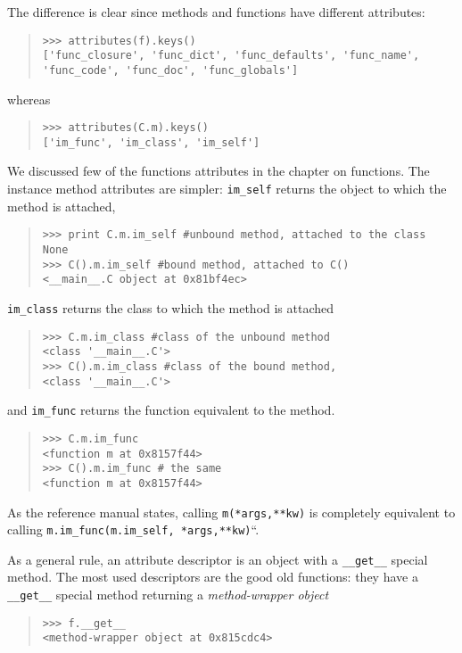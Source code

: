 \documentclass[10pt,english]{article}
\begin{document}
The difference is clear since methods and functions have different attributes:
\begin{quote}
\begin{verbatim}>>> attributes(f).keys()
['func_closure', 'func_dict', 'func_defaults', 'func_name', 
'func_code', 'func_doc', 'func_globals']\end{verbatim}
\end{quote}

whereas
\begin{quote}
\begin{verbatim}>>> attributes(C.m).keys()
['im_func', 'im_class', 'im_self']\end{verbatim}
\end{quote}

We discussed few of the functions attributes in the chapter
on functions. The instance method attributes are simpler: \texttt{im{\_}self} 
returns the object to which the method is attached,
\begin{quote}
\begin{verbatim}>>> print C.m.im_self #unbound method, attached to the class
None
>>> C().m.im_self #bound method, attached to C()
<__main__.C object at 0x81bf4ec> \end{verbatim}
\end{quote}

\texttt{im{\_}class} returns the class to which the
method is attached
\begin{quote}
\begin{verbatim}>>> C.m.im_class #class of the unbound method
<class '__main__.C'>
>>> C().m.im_class #class of the bound method,
<class '__main__.C'>\end{verbatim}
\end{quote}

and \texttt{im{\_}func} returns the function equivalent to
the method.
\begin{quote}
\begin{verbatim}>>> C.m.im_func
<function m at 0x8157f44>
>>> C().m.im_func # the same
<function m at 0x8157f44>\end{verbatim}
\end{quote}

As the reference manual states, calling 
\texttt{m(*args,**kw)} is completely equivalent to calling 
\texttt{m.im{\_}func(m.im{\_}self, *args,**kw)}``.

As a general rule, an attribute descriptor is an object with a \texttt{{\_}{\_}get{\_}{\_}} 
special method. The most used descriptors are the good old functions:
they have a \texttt{{\_}{\_}get{\_}{\_}} special  method returning a \emph{method-wrapper object}
\begin{quote}
\begin{verbatim}>>> f.__get__
<method-wrapper object at 0x815cdc4>\end{verbatim}
\end{quote}
\end{document}
